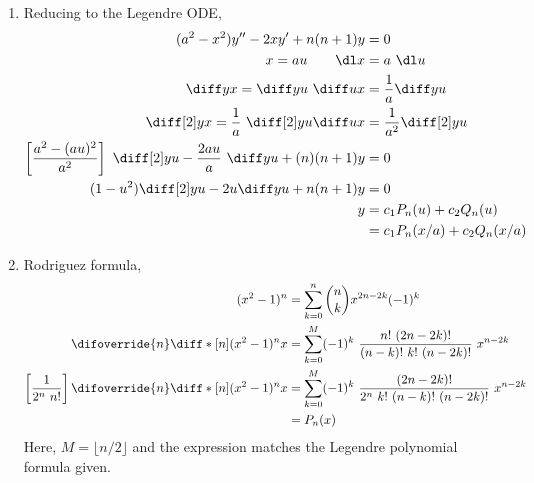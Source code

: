 \begin{enumerate}
    \item Reducing to the Legendre ODE,
          \begin{align}
              (a^2 - x^2)y'' - 2xy' + n(n+1)y       & = 0                             \\
              x = au \qquad \dl x                   & = a\ \dl u                      \\
              \diff yx = \diff yu \ \diff ux        & = \frac{1}{a} \diff yu          \\
              \diff[2]yx = \frac{1}{a}\ \diff[2]yu
              \diff ux                              & = \frac{1}{a^2} \diff[2]yu      \\
              \left[ \frac{a^2 - (au)^2}{a^2} \right]\ \diff[2]yu
              - \frac{2au}{a}\ \diff yu + (n)(n+1)y & = 0                             \\
              (1 - u^2) \diff[2]yu - 2u \diff yu
              + n(n+1)y                             & = 0                             \\
              y                                     & = c_1 P_n (u) + c_2 Q_n (u)     \\
                                                    & = c_1 P_n (x/a) + c_2 Q_n (x/a)
          \end{align}

    \item Rodriguez formula,
          \begin{align}
              (x^2 - 1)^n                               & = \sum_{k = 0}^{n}
              \binom{n}{k} x^{2n-2k}(-1)^k                                   \\
              \difoverride{n} \diff*[n] {(x^2 -1)^n}{x} &
              = \sum_{k=0}^{M}(-1)^k\ \frac{n!\ (2n-2k)!}
              {(n-k)!\ k!\ (n-2k)!}\ x^{n - 2k}                              \\
              \left[ \frac{1}{2^n\ n!} \right] \difoverride{n}
              \diff*[n] {(x^2 -1)^n}{x}                 &
              = \sum_{k=0}^{M}(-1)^k\ \frac{(2n-2k)!}
              {2^n\ k!\ (n-k)!\ (n-2k)!}\ x^{n - 2k}                         \\
                                                        & = P_n (x)
          \end{align}
          Here, $ M = \lfloor n/2 \rfloor $ and the expression matches the Legendre
          polynomial formula given.


\end{enumerate}
